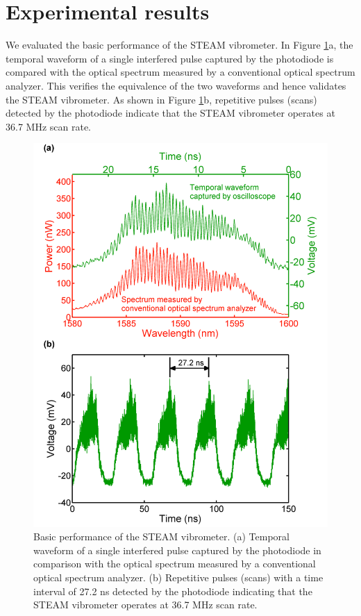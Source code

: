 \section{Experimental results}

We evaluated the basic performance of the STEAM vibrometer. In Figure \ref{fig:APL2011_Figure2}a, the temporal waveform of a single interfered pulse captured by the photodiode is compared with the optical spectrum measured by a conventional optical spectrum analyzer. This verifies the equivalence of the two waveforms and hence validates the STEAM vibrometer. As shown in Figure \ref{fig:APL2011_Figure2}b, repetitive pulses (scans) detected by the photodiode indicate that the STEAM vibrometer operates at 36.7 MHz scan rate.

\begin{figure}[htb!]
\centering
\includegraphics[scale=1]{APL2011/Figure2.png}
\caption{Basic performance of the STEAM vibrometer. (a) Temporal waveform of a single interfered pulse captured by the photodiode in comparison with the optical spectrum measured by a conventional optical spectrum analyzer. (b) Repetitive pulses (scans) with a time interval of 27.2 ns detected by the photodiode indicating that the STEAM vibrometer operates at 36.7 MHz scan rate.}
\label{fig:APL2011_Figure2}
\end{figure}

